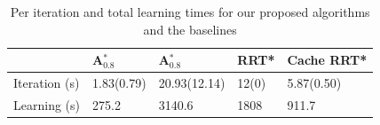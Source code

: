 \documentclass{article}  %
\begin{document}
	\begin{table}[]
	\centering
	\label{tab:time}
	\begin{tabular}{|l|l|l|l|l|}
	\hline
	                        & A$_{0.8}^*$     & A$_{0.8}^*$       & RRT*  & Cache RRT* \\ \hline
	Iteration (s) & 1.83(0.79) & 20.93(12.14) & 12(0) & 5.87(0.50)  \\ \hline
	Learning (s) & 275.2      & 3140.6       & 1808  & 911.7       \\ \hline
	\end{tabular}
	\caption{Per iteration and total learning times for our proposed algorithms and the baselines}
	\end{table}




\end{document}
